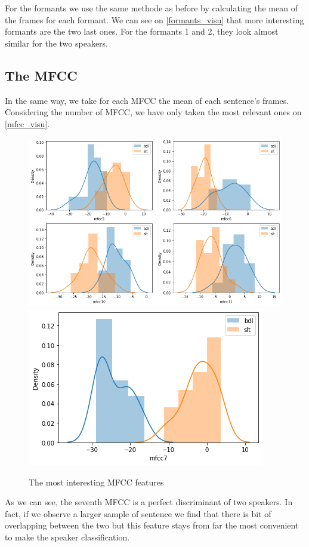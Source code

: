 \documentclass[]{article}
\begin{document}
For the formants we use the same methode as before by calculating the mean of the frames for
each formant. We can see on \autoref{formants_visu} that more interesting formants are the two
last ones. For the formants 1 and 2, they look almost similar for the two speakers.

\subsection{The MFCC}

In the same way, we take for each MFCC the mean of each sentence's frames. Considering
the number of MFCC, we have only taken the most relevant ones on \autoref{mfcc_visu}. 

\begin{figure}[H]
    \centering
    \caption{\label{mfcc_visu}The most interesting MFCC features}
    \includegraphics[scale=0.5]{images/mfcc_visu.png}
    \includegraphics[scale=0.5]{images/mfcc7_visu.png}
\end{figure}

As we can see, the seventh MFCC is a perfect discriminant of two speakers. In fact,
if we observe a larger sample of sentence we find that there is bit of overlapping 
between the two but this feature stays from far the most convenient to make the
speaker classification.
\end{document}
